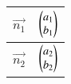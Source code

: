 \begin{tabular}{|c|c|}
\hline
$\vec{n_1}$ & $\begin{pmatrix}a_1\\b_1\end{pmatrix}$\\
\hline
$\vec{n_2}$& $\begin{pmatrix}a_2\\b_2\end{pmatrix}$\\
\hline
\end{tabular}

